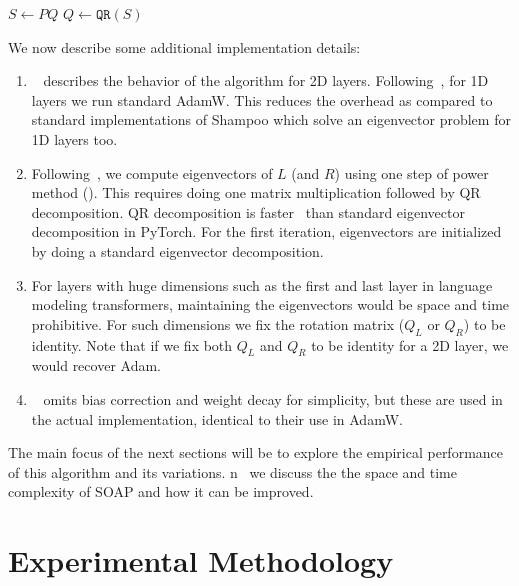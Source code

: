 \documentclass{article}
\begin{document}
\begin{algorithm}[t]
	
	\begin{algorithmic}[1]
		\STATE $S \gets PQ$
            \STATE $Q \gets \texttt{QR}(S)$
	\end{algorithmic}
	\caption{\texttt{Eigenvectors} function, implemented using power iteration and QR decomposition. Inputs: PSD matrix $P$ and estimate of eigenvectors $Q$. If the estimate was exact we would have $P = Q D Q^T$ where $D$ is the diagonal matrix with eigenvalues.}
	\label{alg:eigenvectors}
\end{algorithm}

We now describe some additional implementation details:
\begin{enumerate}
	\item ~ describes the behavior of the algorithm for 2D layers. Following~\citet{galore}, for 1D layers we run standard AdamW. This reduces the overhead as compared to standard implementations of Shampoo which solve an eigenvector problem for 1D layers too. 
	\item Following~\citet{4bitshampoo}, we compute eigenvectors of $L$ (and $R$) using one step of power method (). This requires doing one matrix multiplication followed by QR decomposition. QR decomposition is faster~\citep{eigh-vs-qr} than standard eigenvector decomposition in PyTorch. For the first iteration, eigenvectors are initialized by doing a standard eigenvector decomposition.  
	\item For layers with huge dimensions such as the first and last layer in language modeling transformers, maintaining the eigenvectors would be space and time prohibitive. For such dimensions we fix the rotation matrix ($Q_L$ or $Q_R$) to be identity. Note that if we fix both $Q_L$ and $Q_R$ to be identity for a 2D layer, we would recover Adam.
        \item ~ omits bias correction and weight decay for simplicity, but these are used in the actual implementation, identical to their use in AdamW.
\end{enumerate}

The main focus of the next sections will be to explore the empirical performance of this algorithm and its variations. n~ we discuss the the space and time complexity of SOAP and how it can be improved.

\section{Experimental Methodology}
\label{sec:methods}
\end{document}
